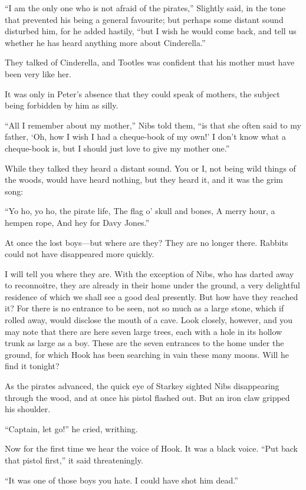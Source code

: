 ``I am the only one who is not afraid of the pirates,'' Slightly said, in the
tone that prevented his being a general favourite; but perhaps some distant
sound disturbed him, for he added hastily, ``but I wish he would come back, and
tell us whether he has heard anything more about Cinderella.''

They talked of Cinderella, and Tootles was confident that his mother must have
been very like her.

It was only in Peter's absence that they could speak of mothers, the subject
being forbidden by him as silly.

``All I remember about my mother,'' Nibs told them, ``is that she often said to
my father, ‘Oh, how I wish I had a cheque-book of my own!' I don't know what a
cheque-book is, but I should just love to give my mother one.''

While they talked they heard a distant sound.
You or I, not being wild things of the woods, would have heard nothing, but they
heard it, and it was the grim song:

``Yo ho, yo ho, the pirate life,
    The flag o' skull and bones,
A merry hour, a hempen rope,
    And hey for Davy Jones.''

At once the lost boys---but where are they?
They are no longer there.
Rabbits could not have disappeared more quickly.

I will tell you where they are.
With the exception of Nibs, who has darted away to reconnoitre, they are already
in their home under the ground, a very delightful residence of which we shall
see a good deal presently.
But how have they reached it?
For there is no entrance to be seen, not so much as a large stone, which if
rolled away, would disclose the mouth of a cave.
Look closely, however, and you may note that there are here seven large trees,
each with a hole in its hollow trunk as large as a boy.
These are the seven entrances to the home under the ground, for which Hook has
been searching in vain these many moons.
Will he find it tonight?

As the pirates advanced, the quick eye of Starkey sighted Nibs disappearing
through the wood, and at once his pistol flashed out.
But an iron claw gripped his shoulder.

``Captain, let go!'' he cried, writhing.

Now for the first time we hear the voice of Hook.
It was a black voice.
``Put back that pistol first,'' it said threateningly.

``It was one of those boys you hate.
I could have shot him dead.''

